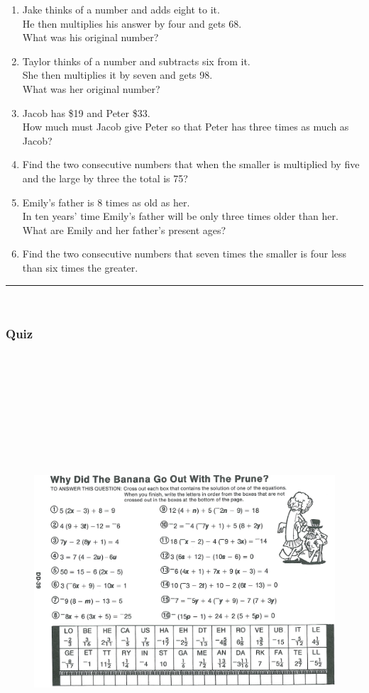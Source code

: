 \documentclass[a4paper,12pt]{article}
\newcommand\questionend{
	\rule[0pt]{17cm}{0.5pt}\vspace{0.0cm}\\
}
\newcommand\quiz{
\subsubsection{Quiz}\vspace{-0.5cm}
}
\begin{document}
	\begin{enumerate}[label=\normalsize \alph*)~~~]
\item Jake thinks of a number and adds eight to it. \\
He then multiplies his answer by four and gets 68. \\
What was his original number?
\item Taylor thinks of a number and subtracts six from it. \\
She then multiplies it by seven and gets 98. \\
What was her original number?

\item Jacob has \$19 and Peter \$33. \\
How much must Jacob give Peter so that Peter has three times as much as Jacob?
\item Find the two consecutive numbers that when the smaller is multiplied by five and the large by three the total is 75?
\item Emily’s father is 8 times as old as her. \\
In ten years’ time Emily’s father will be only three times older than her. \\
What are Emily and her father’s present ages?
\item Find the two consecutive numbers that seven times the smaller is four less than six times the greater.
\end{enumerate}
\questionend
\newpage
\quiz
\begin{figure}[!h]
	\centering
	\includegraphics[height=17cm, angle=90, origin=c]{pizzazz/pizzazz_set1_9.pdf}
\end{figure}
\end{document}
